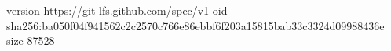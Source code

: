 version https://git-lfs.github.com/spec/v1
oid sha256:ba050f04f941562c2c2570c766e86ebbf6f203a15815bab33c3324d09988436e
size 87528
